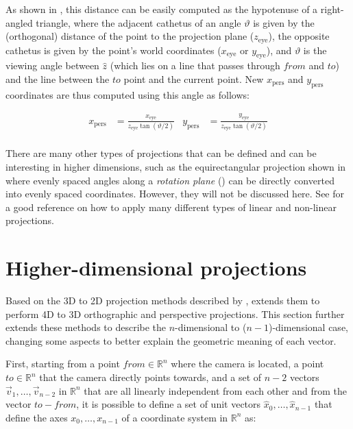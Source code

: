 As shown in , this distance can be easily computed as the hypotenuse of a right-angled triangle, where the adjacent cathetus of an angle $\vartheta$ is given by the (orthogonal) distance of the point to the projection plane ($z_\mathrm{eye}$), the opposite cathetus is given by the point's world coordinates ($x_\mathrm{eye}$ or $y_\mathrm{eye}$), and $\vartheta$ is the viewing angle between $\hat{z}$ (which lies on a line that passes through $from$ and $to$) and the line between the $to$ point and the current point.
New $x_\mathrm{pers}$ and $y_\mathrm{pers}$ coordinates are thus computed using this angle as follows:

\begin{align*}
x_\mathrm{pers} &= \frac{x_\mathrm{eye}}{z_\mathrm{eye} \tan(\vartheta / 2)} &
y_\mathrm{pers} &= \frac{y_\mathrm{eye}}{z_\mathrm{eye} \tan(\vartheta / 2)} \\
\end{align*}

There are many other types of projections that can be defined and can be interesting in higher dimensions, such as the equirectangular projection shown in  where evenly spaced angles along a \emph{rotation plane} () can be directly converted into evenly spaced coordinates.
However, they will not be discussed here.
See \citet[Chs.~5--7]{Salomon11} for a good reference on how to apply many different types of linear and non-linear projections.

\section{Higher-dimensional projections}
\label{se:4dto3d}

Based on the 3D to 2D projection methods described by \citet{Foley92}, \citet{Hollasch91} extends them to perform 4D to 3D orthographic and perspective projections.
This section further extends these methods to describe the $n$-dimensional to ($n-1$)-dimensional case, changing some aspects to better explain the geometric meaning of each vector.

First, starting from a point $from \in \mathbb{R}^n$ where the camera is located, a point $to \in \mathbb{R}^n$ that the camera directly points towards, and a set of $n-2$ vectors $\overrightarrow{v}_1, \ldots, \overrightarrow{v}_{n-2}$ in $\mathbb{R}^n$ that are all linearly independent from each other and from the vector $to - from$, it is possible to define a set of unit vectors $\hat{x}_0, \ldots, \hat{x}_{n-1}$ that define the axes $x_0, \ldots, x_{n-1}$ of a coordinate system in $\mathbb{R}^n$ as:

